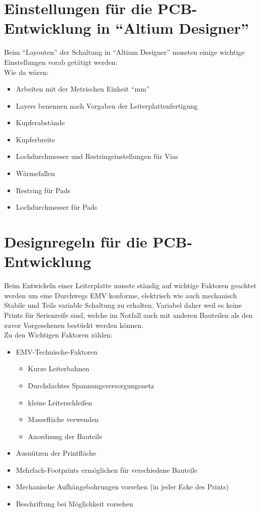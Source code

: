 \section{Einstellungen für die PCB-Entwicklung in \enquote{Altium Designer}}\label{subsec:8.1}
Beim \enquote{Layouten} der Schaltung in \enquote{Altium Designer} mussten einige wichtige Einstellungen vorab getätigt werden:\\
Wie da wären:
\begin{itemize}
	\item Arbeiten mit der Metrischen Einheit \enquote{mm}
	\item Layers benennen nach Vorgaben der Leiterplattenfertigung
	\item Kupferabstände
	\item Kupferbreite
	\item Lochdurchmesser und Restringeinstellungen für Vias
	\item Wärmefallen
	\item Restring für Pads
	\item Lochdurchmesser für Pads
\end{itemize}


\section{Designregeln für die PCB-Entwicklung}\label{subsec:8.2}
Beim Entwickeln einer Leiterplatte musste ständig auf wichtige Faktoren geachtet werden um eine Durchwegs EMV konforme, elektrisch wie auch mechanisch Stabile und Teils variable Schaltung zu erhalten.
Variabel daher weil es keine Prints für Serienreife sind, welche im Notfall auch mit anderen Bauteilen als den zuvor Vorgesehenen bestückt werden können.\\
Zu den Wichtigen Faktoren zählen:
\begin{itemize}
	\item EMV-Technische-Faktoren
	\begin{itemize}
		\item Kurze Leiterbahnen
		\item Durchdachtes Spannungsversorgungsnetz
		\item kleine Leiterschleifen
		\item Massefläche verwenden
		\item Anordnung der Bauteile
	\end{itemize}
	\item Ausnützen der Printfläche
	\item Mehrfach-Footprints ermöglichen für verschiedene Bauteile
	\item Mechanische Aufhängebohrungen vorsehen (in jeder Ecke des Prints)
	\item Beschriftung bei Möglichkeit vorsehen
\end{itemize}


